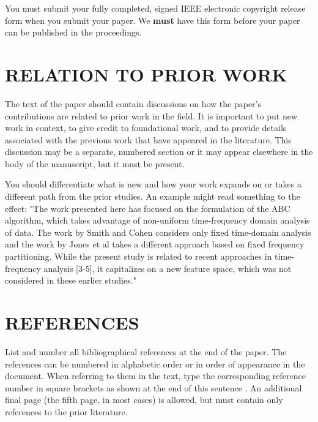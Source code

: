 \documentclass{article}
\begin{document}
	You must submit your fully completed, signed IEEE electronic copyright release
	form when you submit your paper. We {\bf must} have this form before your paper
	can be published in the proceedings.
	
	\section{RELATION TO PRIOR WORK}
	\label{sec:prior}
	
	The text of the paper should contain discussions on how the paper's
	contributions are related to prior work in the field. It is important
	to put new work in  context, to give credit to foundational work, and
	to provide details associated with the previous work that have appeared
	in the literature. This discussion may be a separate, numbered section
	or it may appear elsewhere in the body of the manuscript, but it must
	be present.
	
	You should differentiate what is new and how your work expands on
	or takes a different path from the prior studies. An example might
	read something to the effect: "The work presented here has focused
	on the formulation of the ABC algorithm, which takes advantage of
	non-uniform time-frequency domain analysis of data. The work by
	Smith and Cohen \cite{Lamp86} considers only fixed time-domain analysis and
	the work by Jones et al \cite{C2} takes a different approach based on
	fixed frequency partitioning. While the present study is related
	to recent approaches in time-frequency analysis [3-5], it capitalizes
	on a new feature space, which was not considered in these earlier
	studies."
	
	\vfill\pagebreak
	
	\section{REFERENCES}
	\label{sec:refs}
	
	List and number all bibliographical references at the end of the
	paper. The references can be numbered in alphabetic order or in
	order of appearance in the document. When referring to them in
	the text, type the corresponding reference number in square
	brackets as shown at the end of this sentence \cite{C2}. An
	additional final page (the fifth page, in most cases) is
	allowed, but must contain only references to the prior
	literature.
	
	
	
	
\end{document}
